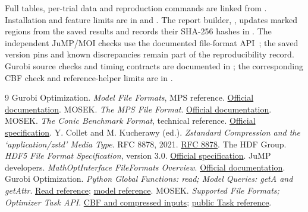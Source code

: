 \documentclass[10pt]{article}
\begin{document}
\begin{sloppypar}
Full tables, per-trial data and reproduction commands are linked from
. Installation and feature limits are in
 and .
The report builder, , updates marked
regions from the saved results and records their SHA-256 hashes in
. The independent JuMP/MOI checks use the documented
file-format API~\cite{moi}; the saved version pins and known discrepancies
remain part of the reproducibility record. Gurobi source checks and timing
contracts are documented in ; the corresponding
CBF check and reference-helper limits are in .
\end{sloppypar}
\begin{thebibliography}{9}
\small
{} Gurobi Optimization. \emph{Model File Formats}, MPS reference.
\href{https://docs.gurobi.com/projects/optimizer/en/current/reference/fileformats/modelformats.html}{Official documentation}.
 MOSEK. \emph{The MPS File Format}.
\href{https://docs.mosek.com/latest/cxxfusion/mps-format.html}{Official documentation}.
 MOSEK. \emph{The Conic Benchmark Format}, technical reference.
\href{https://docs.mosek.com/latest/capi/cbf-format.html}{Official specification}.
 Y. Collet and M. Kucherawy (ed.). \emph{Zstandard Compression and
 the `application/zstd' Media Type}. RFC 8878, 2021.
\href{https://www.rfc-editor.org/rfc/rfc8878.html}{RFC 8878}.
 The HDF Group. \emph{HDF5 File Format Specification}, version 3.0.
\href{https://support.hdfgroup.org/documentation/hdf5/latest/_f_m_t3.html}{Official specification}.
 JuMP developers. \emph{MathOptInterface FileFormats Overview}.
\href{https://jump.dev/MathOptInterface.jl/stable/submodules/FileFormats/overview/}{Official documentation}.
 Gurobi Optimization. \emph{Python Global Functions: read;
 Model Queries: getA and getAttr}.
\href{https://docs.gurobi.com/projects/optimizer/en/current/reference/python/func_global.html#read}{Read reference};
\href{https://docs.gurobi.com/projects/optimizer/en/current/reference/python/model.html}{model reference}.
 MOSEK. \emph{Supported File Formats; Optimizer Task API}.
\href{https://docs.mosek.com/latest/pythonapi/supported-file-formats.html}{CBF and compressed inputs};
\href{https://docs.mosek.com/latest/pythonapi/optimizer-task.html}{public Task reference}.
\end{thebibliography}
\end{document}

